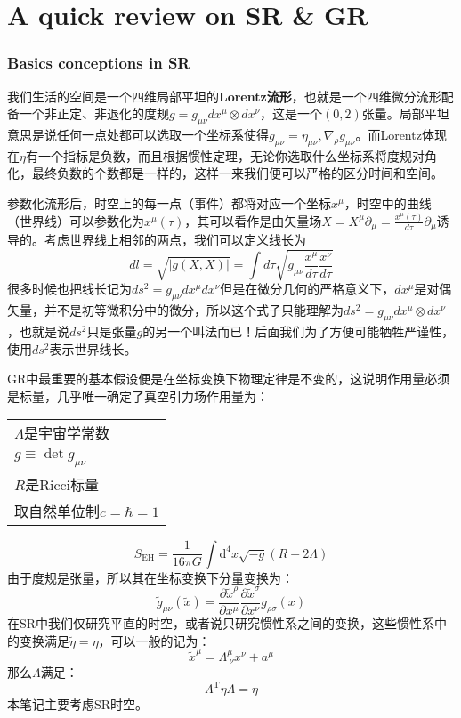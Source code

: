 \part{A quick review on SR \& GR}
\section{Basics conceptions in SR}\label{sec:1}
我们生活的空间是一个四维局部平坦的\textbf{Lorentz流形}，也就是一个四维微分流形配备一个非正定、非退化的度规$g=g_{\mu\nu}dx^\mu\otimes dx^\nu$，这是一个$(0,2)$张量。局部平坦意思是说任何一点处都可以选取一个坐标系使得$g_{\mu\nu}=\eta_{\mu\nu},\nabla_\rho g_{\mu\nu}$。而Lorentz体现在$\eta$有一个指标是负数，而且根据惯性定理，无论你选取什么坐标系将度规对角化，最终负数的个数都是一样的，这样一来我们便可以严格的区分时间和空间。

参数化流形后，时空上的每一点（事件）都将对应一个坐标$x^\mu$，时空中的曲线（世界线）可以参数化为$x^\mu(\tau)$，其可以看作是由矢量场$X=X^\mu\partial_\mu=\frac{x^\mu(\tau)}{d\tau}\partial_\mu$诱导的。考虑世界线上相邻的两点，我们可以定义线长为
\[dl=\sqrt{|g(X,X)|}=\int d\tau\sqrt{g_{\mu\nu}\frac{x^\mu}{d\tau}\frac{x^\nu}{d\tau}}\]
很多时候也把线长记为$ds^2=g_{\mu\nu}dx^\mu dx^\nu$但是在微分几何的严格意义下，$dx^\mu$是对偶矢量，并不是初等微积分中的微分，所以这个式子只能理解为$ds^2=g_{\mu\nu}dx^\mu\otimes dx^\nu$，也就是说$ds^2$只是张量$g$的另一个叫法而已！后面我们为了方便可能牺牲严谨性，使用$ds^2$表示世界线长。

GR中最重要的基本假设便是在坐标变换下物理定律是不变的，这说明作用量必须是标量，几乎唯一确定了真空引力场作用量为：
\begin{margintable}\footnotesize 
	\begin{tabularx}{\marginparwidth}{|X}
		$\Lambda$是宇宙学常数\\
		$g\equiv\det g_{\mu\nu}$\\
		$R$是Ricci标量\\
		取自然单位制$c=\hbar=1$
	\end{tabularx}
\end{margintable}
\begin{equation}
	S_{\mathrm{EH}}=\frac{1}{16\pi G}\int \mathrm{d}^4x\sqrt{-g} (R-2\Lambda)
\end{equation}
由于度规是张量，所以其在坐标变换下分量变换为：
\[\tilde{g}_{\mu\nu}(\tilde{x})=\frac{\partial \tilde{x}^\rho}{\partial x^\mu}\frac{\partial \tilde{x}^\sigma}{\partial x^\nu}g_{\rho\sigma}(x)\]
在SR中我们仅研究平直的时空，或者说只研究惯性系之间的变换，这些惯性系中的变换满足$\tilde{\eta}=\eta$，可以一般的记为：
\[\tilde{x}^\mu=\Lambda^{\mu}_{\ \nu}x^\nu+a^\mu\]
那么$\Lambda$满足：
\begin{equation}
	\Lambda^{\operatorname{T}}\eta\Lambda=\eta
\end{equation}
本笔记主要考虑SR时空。
